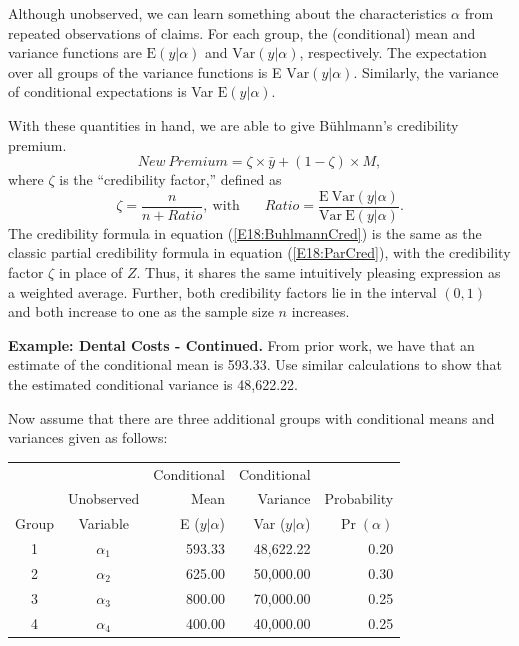 Although unobserved, we can learn something about the
characteristics $\alpha$ from repeated observations of claims. For
each group, the (conditional) mean and variance functions are
$\mathrm{E}(y | \alpha)$ and $\mathrm{Var}(y | \alpha)$,
respectively. The expectation over all groups of the variance
functions is E $\mathrm{Var}(y | \alpha)$. Similarly, the variance
of conditional expectations is Var $\mathrm{E}(y | \alpha)$.

With these quantities in hand, we are able to give B\"{u}hlmann's
credibility premium.
\begin{equation}\label{E18:BuhlmannCred}
New~Premium =  \zeta \times \bar{y} + (1 - \zeta)  \times M,
\end{equation}
where $\zeta$ is the ``credibility factor,'' defined as
\begin{equation}\label{E18:BuhlmannCredFactor}
\zeta = \frac{n}{n+Ratio}, ~\mathrm{with}~~~~~~~~Ratio =
\frac{\mathrm{E~}\mathrm{Var}(y | \alpha)}{\mathrm{Var}~\mathrm{E}(y
| \alpha)}.
\end{equation}
The credibility formula in equation (\ref{E18:BuhlmannCred}) is the
same as the classic partial credibility formula in equation
(\ref{E18:ParCred}), with the credibility factor $\zeta$ in place of
$Z$. Thus, it shares the same intuitively pleasing expression as a
weighted average. Further, both credibility factors lie in the
interval $(0,1)$ and both increase to one as the sample size $n$
increases.



\linejed

\textbf{Example: Dental Costs - Continued.} From prior work, we have
that an estimate of the conditional mean is 593.33. Use similar
calculations to show that the estimated conditional variance is
48,622.22.

Now assume that there are three additional groups with conditional
means and variances given as follows:
\begin{center}
\begin{tabular}{ccrrr}
  \hline
        &            & Conditional   & Conditional       \\
        & Unobserved &         Mean  &  Variance         &  Probability \\
   Group& Variable   & E ($y|\alpha$)&  Var ($y|\alpha$) &  $\Pr(\alpha)$ \\
    \hline
1 & $\alpha_1$ & 593.33 & 48,622.22 & 0.20 \\
2  & $\alpha_2$& 625.00 & 50,000.00 & 0.30 \\
3  & $\alpha_3$& 800.00 & 70,000.00 & 0.25 \\
4  & $\alpha_4$& 400.00 & 40,000.00 & 0.25 \\
  \hline
\end{tabular}\end{center}

